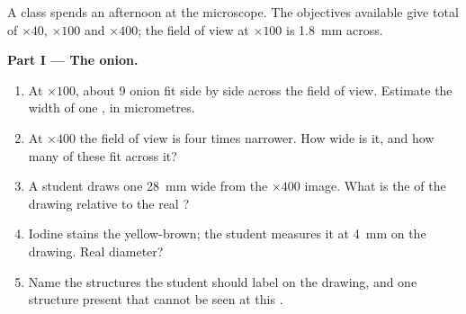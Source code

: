 \begin{problem}
\label{pb:g10:cells-common-unit:1}
A class spends an afternoon at the microscope. The objectives available
give total  of $\times 40$, $\times 100$ and
$\times 400$; the field of view at $\times 100$ is \qty{1.8}{mm} across.

\medskip
\noindent\textbf{Part I --- The onion.}
\begin{enumerate}
  \item At $\times 100$, about 9 onion  fit side by side across
        the field of view. Estimate the width of one , in
        micrometres.
  \item At $\times 400$ the field of view is four times narrower. How
        wide is it, and how many of these  fit across it?
  \item A student draws one  \qty{28}{mm} wide from the
        $\times 400$ image. What is the  of the drawing
        relative to the real ?
  \item Iodine stains the  yellow-brown; the student measures it
        at \qty{4}{mm} on the drawing. Real diameter?
  \item Name the structures the student should label on the drawing,
        and one structure present that cannot be seen at this
        .
\end{enumerate}


\end{problem}
